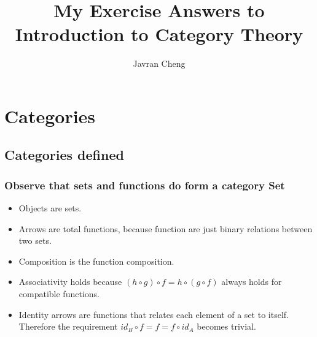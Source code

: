 \documentclass[11pt]{article}
\title{My Exercise Answers to \\
Introduction to Category Theory}
\author{Javran Cheng}
\begin{document}
\maketitle

\newcommand{\cat}[1]{\textbf{#1}}
\newcommand{\fcomp}{\circ}

\section{Categories}

\subsection{Categories defined}

\subsubsection{Observe that sets and functions do form a category \cat{Set}}

\begin{itemize}
  \item Objects are sets.
  \item Arrows are total functions, because function are just binary relations
    between two sets.
  \item Composition is the function composition.
  \item Associativity holds because $(h \fcomp g) \fcomp f = h \fcomp (g \fcomp f)$
    always holds for compatible functions.
  \item Identity arrows are functions that relates each element of a set to itself.
    Therefore the requirement $id_B \fcomp f = f = f \fcomp id_A$ becomes trivial.
\end{itemize}
\end{document}
